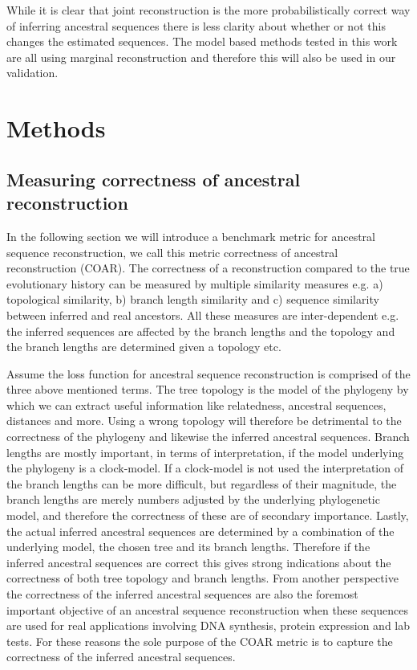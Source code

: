 While it is clear that joint reconstruction is the more probabilistically correct way of inferring ancestral sequences there is less clarity about whether or not this changes the estimated sequences.
The model based methods tested in this work are all using marginal reconstruction and therefore this will also be used in our validation.






\section{Methods}

\subsection{Measuring correctness of ancestral reconstruction}
In the following section we will introduce a benchmark metric for ancestral sequence reconstruction, we call this metric correctness of ancestral reconstruction (COAR).
The correctness of a reconstruction compared to the true evolutionary history can be measured by multiple similarity measures e.g. a) topological similarity, b) branch length similarity and c) sequence similarity between inferred and real ancestors.
All these measures are inter-dependent e.g. the inferred sequences are affected by the branch lengths and the topology and the branch lengths are determined given a topology etc.

Assume the loss function for ancestral sequence reconstruction is comprised of the three above mentioned terms.
The tree topology is the model of the phylogeny by which we can extract useful information like relatedness, ancestral sequences, distances and more.
Using a wrong topology will therefore be detrimental to the correctness of the phylogeny and likewise the inferred ancestral sequences.
Branch lengths are mostly important, in terms of interpretation, if the model underlying the phylogeny is a clock-model.
If a clock-model is not used the interpretation of the branch lengths can be more difficult, but regardless of their magnitude, the branch lengths are merely numbers adjusted by the underlying phylogenetic model, and therefore the correctness of these are of secondary importance.
Lastly, the actual inferred ancestral sequences are determined by a combination of the underlying model, the chosen tree and its branch lengths.
Therefore if the inferred ancestral sequences are correct this gives strong indications about the correctness of both tree topology and branch lengths.
From another perspective the correctness of the inferred ancestral sequences are also the foremost important objective of an ancestral sequence reconstruction when these sequences are used for real applications involving DNA synthesis, protein expression and lab tests.
For these reasons the sole purpose of the COAR metric is to capture the correctness of the inferred ancestral sequences.


